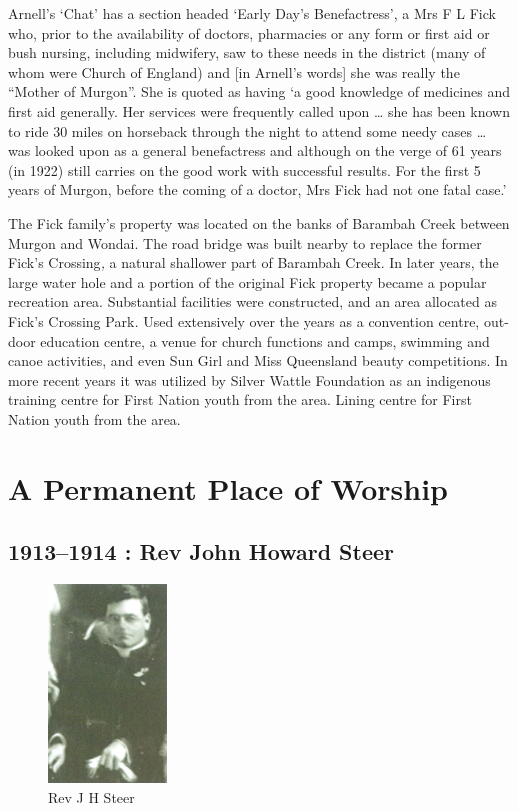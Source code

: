 Arnell's `Chat' has a section headed `Early Day's Benefactress', a Mrs F
L Fick who, prior to the availability of doctors, pharmacies or any form
or first aid or bush nursing, including midwifery, saw to these needs in
the district (many of whom were Church of England) and {[}in Arnell's
words{]} she was really the ``Mother of Murgon''. She is quoted as
having `a good knowledge of medicines and first aid generally. Her
services were frequently called upon \ldots{} she has been known to ride
30 miles on horseback through the night to attend some needy cases
\ldots{} was looked upon as a general benefactress and although on the
verge of 61 years (in 1922) still carries on the good work with
successful results. For the first 5 years of Murgon, before the coming
of a doctor, Mrs Fick had not one fatal case.'

The Fick family's property was located on the banks of Barambah Creek
between Murgon and Wondai. The road bridge was built nearby to replace
the former Fick's Crossing\emph{,} a natural shallower part of Barambah
Creek. In later years, the large water hole and a portion of the
original Fick property became a popular recreation area. Substantial
facilities were constructed, and an area allocated as Fick's Crossing
Park\emph{.} Used extensively over the years as a convention centre,
out-door education centre, a venue for church functions and camps,
swimming and canoe activities, and even Sun Girl and Miss Queensland
beauty competitions. In more recent years it was utilized by Silver
Wattle Foundation as an indigenous training centre for First Nation
youth from the area. Lining centre for First Nation youth from the area.

\printendnotes[custom]
\setcounter{endnote}{0}
\chapter{A Permanent Place of
Worship}

\section{1913--1914 : Rev John Howard
Steer}




\begin{figure}
\begin{center}
\includegraphics[width=0.28\textwidth,right]{images/JHSteer.png}
\caption{Rev J H Steer}
\end{center}
\end{figure}


